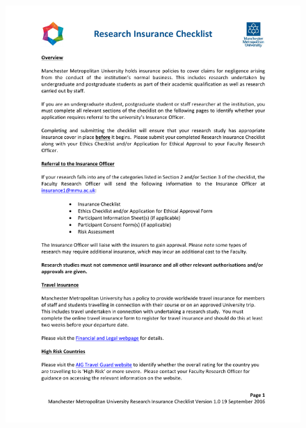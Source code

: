 \documentclass[a4paper,12pt]{report}
\begin{document}
\begin{appendices}
    \begin{figure}[h]
      \centering
      \includegraphics[scale=0.8]{insurance-checklist-1}
    \end{figure}


\end{appendices}
\end{document}
